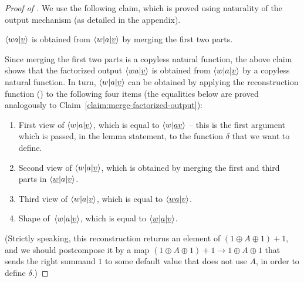 \begin{proof}[Proof of ]
    We use the following claim, which is proved using naturality of the output mechanism (as detailed in the appendix).
    \begin{claim}\label{claim:merge-factorized-output}
        $\langle wa|\underline v \rangle$ is obtained from $\langle w|a|\underline v \rangle$ by merging the first two parts.
    \end{claim}

    Since merging the first two parts is a copyless natural function,  the above
    claim shows that  the factorized output $\langle wa|\underline v \rangle$ is
    obtained from $\langle w|a|\underline v \rangle$ by a copyless natural function.
    In turn, $\langle w|a|\underline v \rangle$ can be obtained by applying the reconstruction function () to the following four items (the equalities below are proved analogously to Claim~\ref{claim:merge-factorized-output}):
     \begin{enumerate}
        \item \label{it:first-view}First view of $\langle w|a|\underline v \rangle$, which is equal to $\langle w|\underline {av} \rangle$ -- this is the first argument which is passed, in the lemma statement, to the function $\delta$ that we want to define.
        \item  \label{it:second-view} Second view of $\langle w|a|\underline v \rangle$, which is obtained by merging the first and third parts in $\langle \underline w|a|\underline v \rangle$.
        \item \label{it:third-view}   Third view of $\langle w|a|\underline v \rangle$, which is equal to $\langle \underline {wa}|\underline{v} \rangle$.
        \item   \label{it:shape} Shape of~$\langle w|a|\underline v \rangle$, which is equal to $\langle \underline w|\underline a| \underline v \rangle$.
     \end{enumerate}
     (Strictly speaking, this reconstruction returns an element of $(1 \oplus A \oplus 1)+1$, and we should postcompose it by a map $(1 \oplus A \oplus 1)+1 \to 1 \oplus A \oplus 1$ that sends the right summand $1$ to some default value that does not use $A$, in order to define $\delta$.)
     

\end{proof}
